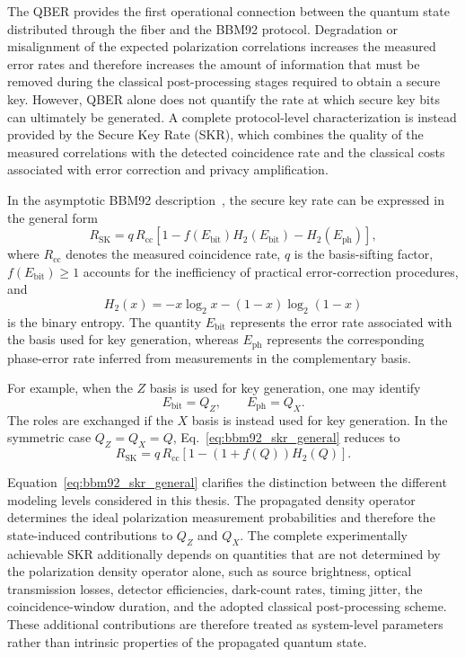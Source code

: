 The QBER provides the first operational connection between the quantum state distributed through the fiber and the BBM92 protocol. Degradation or misalignment of the expected polarization correlations increases the measured error rates and therefore increases the amount of information that must be removed during the classical post-processing stages required to obtain a secure key. However, QBER alone does not quantify the rate at which secure key bits can ultimately be generated. A complete protocol-level characterization is instead provided by the Secure Key Rate (SKR), which combines the quality of the measured correlations with the detected coincidence rate and the classical costs associated with error correction and privacy amplification.

In the asymptotic BBM92 description~\cite{dinardo_thesis}, the secure key rate can be expressed in the general form
\begin{equation}
R_{\mathrm{SK}}
=
q\,R_{\mathrm{cc}}
\left[
1
-
f(E_{\mathrm{bit}})
H_2(E_{\mathrm{bit}})
-
H_2(E_{\mathrm{ph}})
\right],
\label{eq:bbm92_skr_general}
\end{equation}
where \(R_{\mathrm{cc}}\) denotes the measured coincidence rate, \(q\) is the basis-sifting factor, \(f(E_{\mathrm{bit}})\geq1\) accounts for the inefficiency of practical error-correction procedures, and
\begin{equation}
H_2(x)
=
-x\log_2x
-
(1-x)\log_2(1-x)
\label{eq:binary_entropy_bbm92}
\end{equation}
is the binary entropy. The quantity \(E_{\mathrm{bit}}\) represents the error rate associated with the basis used for key generation, whereas \(E_{\mathrm{ph}}\) represents the corresponding phase-error rate inferred from measurements in the complementary basis.

For example, when the \(Z\) basis is used for key generation, one may identify
\begin{equation}
E_{\mathrm{bit}}=Q_Z,
\qquad
E_{\mathrm{ph}}=Q_X.
\label{eq:bbm92_bit_phase_errors}
\end{equation}
The roles are exchanged if the \(X\) basis is instead used for key generation. In the symmetric case \(Q_Z=Q_X=Q\), Eq.~\eqref{eq:bbm92_skr_general} reduces to
\begin{equation}
R_{\mathrm{SK}}
=
q\,R_{\mathrm{cc}}
\left[
1
-
\left(
1+f(Q)
\right)
H_2(Q)
\right].
\label{eq:bbm92_skr_symmetric}
\end{equation}

Equation~\eqref{eq:bbm92_skr_general} clarifies the distinction between the different modeling levels considered in this thesis. The propagated density operator determines the ideal polarization measurement probabilities and therefore the state-induced contributions to \(Q_Z\) and \(Q_X\). The complete experimentally achievable SKR additionally depends on quantities that are not determined by the polarization density operator alone, such as source brightness, optical transmission losses, detector efficiencies, dark-count rates, timing jitter, the coincidence-window duration, and the adopted classical post-processing scheme. These additional contributions are therefore treated as system-level parameters rather than intrinsic properties of the propagated quantum state.


